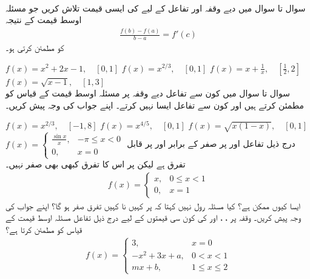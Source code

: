 
\\
سوال  تا سوال  میں دیے وقفہ اور تفاعل کے لیے   کی ایسی قیمت  تلاش کریں جو مسئلہ اوسط قیمت کے نتیجہ 
\begin{align*}
\frac{f(b)-f(a)}{b-a}=f'(c)
\end{align*}
کو مطمئن کرتی ہو۔

$f(x)=x^2+2x-1,\quad [0,1]$
$f(x)=x^{2/3},\quad [0,1]$
$f(x)=x+\tfrac{1}{x},\quad [\tfrac{1}{2},2]$
$f(x)=\sqrt{x-1},\quad [1,3]$
\\
سوال  تا سوال  میں کون سے تفاعل دیے وقفہ پر مسئلہ اوسط قیمت کے قیاس کو مطمئن کرتے ہیں اور کون سے تفاعل ایسا نہیں کرتے۔ اپنے جواب کی وجہ پیش کریں۔ 

$f(x)=x^{2/3},\quad [-1,8]$
$f(x)=x^{4/5},\quad [0,1]$
$f(x)=\sqrt{x(1-x)},\quad [0,1]$
$f(x)=\begin{cases} \tfrac{\sin x}{x},&-\pi\le x< 0\\ 0,&x=0 \end{cases}$
درج ذیل تفاعل  اور  پر صفر کے برابر   اور  پر قابل تفرق ہے لیکن  پر اس کا تفرق کبھی بھی صفر نہیں۔ 
\begin{align*}
f(x)=\begin{cases} x,& 0\le x<1\\ 0,&x=1 \end{cases}
\end{align*}
ایسا کیوں ممکن ہے؟ کیا مسئلہ رول نہیں کہتا کہ  پر کہیں نا کہیں  تفرق صفر ہو گا؟ اپنے جواب کی وجہ پیش کریں۔
وقفہ  پر ، ،  اور  کی کون سی قیمتوں کے لیے  درج ذیل تفاعل مسئلہ اوسط قیمت کے قیاس کو مطمئن کرتا ہے؟
\begin{align*}
f(x)=\begin{cases} 3,&x=0\\ -x^2+3x+a,&0<x<1\\ mx+b,&1\le x\le 2  \end{cases}
\end{align*}

